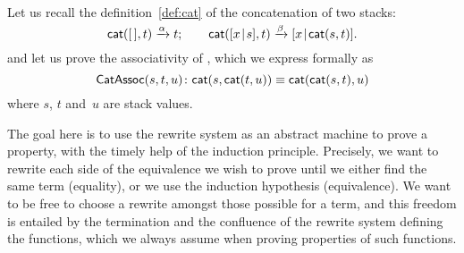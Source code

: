 Let us recall the definition~\eqref{def:cat} of the concatenation of two
stacks:
\begin{equation*}
\fun{cat}(        \el,t) \xrightarrow{\smash{\alpha}} t;\qquad
\fun{cat}(\cons{x}{s},t) \xrightarrow{\smash{\beta}}
\cons{x}{\fun{cat}(s,t)}.
\index{stack!concatenation!definition}
\end{equation*}
and let us prove the
associativity
 of , which
we express formally as
\begin{equation*}
  \pred{CatAssoc}{s,t,u} \colon
\fun{cat}(s,\fun{cat}(t,u)) \equiv
\fun{cat}(\fun{cat}(s,t),u)
\index{CatAssoc@\predName{CatAssoc}|(}
\end{equation*}
where \(s\), \(t\) and~\(u\) are stack values.

The goal here is to use the rewrite system as an abstract machine to
prove a property, with the timely help of the induction
principle. Precisely, we want to rewrite each side of the equivalence
we wish to prove until we either find the same term (equality), or we
use the induction hypothesis (equivalence). We want to be free to
choose a rewrite amongst those possible for a term, and this freedom
is entailed by the termination and the confluence of the rewrite
system defining the functions, which we always assume when proving
properties of such functions.

